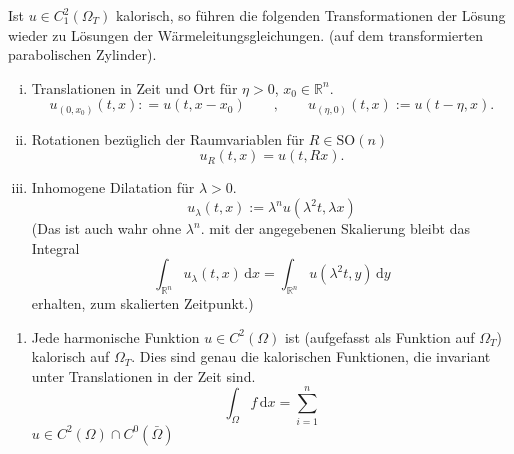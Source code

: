 \begin{bemerkung}
	Ist $u \in C_1^2(\Omega_T)$ kalorisch, so führen die folgenden Transformationen der Lösung wieder zu Lösungen der Wärmeleitungsgleichungen. 
	(auf dem transformierten parabolischen Zylinder). 
	\begin{enumerate}[(i)]
		\item Translationen in Zeit und Ort für $\eta >0$, $x_0 \in \mathbb{R}^n$.
		\[
			u_{(0,x_0)}(t,x): = u(t,x-x_0) \qquad , \qquad u_{(\eta,0)}(t,x) := u(t-\eta,x).
		\]
		\item Rotationen bezüglich der Raumvariablen für $R \in \text{SO}(n)$
		\[
			u_R(t,x) = u(t,Rx).
		\]
		\item Inhomogene Dilatation für $\lambda >0$.
		\[
			u_{\lambda}(t,x) := \lambda^n u ( \lambda^2 t, \lambda x)
		\]
		(Das ist auch wahr ohne $\lambda^n$. mit der angegebenen Skalierung bleibt das Integral
		\[
			\int_{\mathbb{R}^n}^{} u _{\lambda}(t,x) \,\mathrm{d}x = \int_{\mathbb{R}^n}^{} u(\lambda^2t,y) \,\mathrm{d}y
		\] erhalten, zum skalierten Zeitpunkt.)
	\end{enumerate}
\end{bemerkung}

\begin{beispiele}
	\begin{enumerate}[1)]
		\item Jede harmonische Funktion $u \in C^2(\Omega)$ ist (aufgefasst als Funktion auf $\Omega_T$) kalorisch auf $\Omega_T$. 
		Dies sind genau die kalorischen Funktionen, die invariant unter Translationen in der Zeit sind.
		\[
			\int_{\Omega}^{}f \,\mathrm{d}x = \sum^{n}_{i=1} 
		\] 
		$u \in C^2(\Omega) \cap C^0(\bar{\Omega})$
	\end{enumerate}
\end{beispiele}
